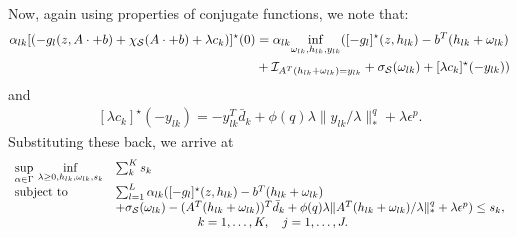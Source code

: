 Now, again using properties of conjugate functions, we note that:
\begin{equation*}
	\begin{aligned}
		\alpha_{lk}[(-g_l(z, A\cdot + b) +\chi_{\mathcal{S}}(A\cdot + b) + \lambda c_k)]^\star (0) &= \alpha_{lk}\underset{\omega_{lk}, h_{lk}, y_{lk}}{\inf} ([-g_l]^\star(z,h_{lk}) - b^T(h_{lk} + \omega_{lk})\\
  &+ \mathcal{I}_{A^T(h_{lk} + \omega_{lk})= y_{lk}} + \sigma_{\mathcal{S}}(\omega_{lk})+[\lambda c_k]^\star (-y_{lk}))
	\end{aligned}
\end{equation*}
and
\begin{equation*}
\begin{aligned}
	[\lambda c_k]^\star (-y_{lk}) =-y_{lk}^T\bar{d}_k + \phi(q)\lambda {\|}y_{lk}/\lambda{\|}^q_* + \lambda \epsilon^p.
 \end{aligned}
\end{equation*}
Substituting these back, we arrive at
\begin{equation*}
	\begin{aligned}
\begin{array}[t]{ll}
	\underset{\alpha \in \Gamma}{\sup}~\underset{\lambda \geq 0, h_{lk},\omega_{lk}, s_k}{\inf} & \sum_k^K s_k\\
	\mbox{subject to} & \sum_{l=1}^L \alpha_{lk}([-g_l]^\star(z,h_{lk}) -b^T(h_{lk} + \omega_{lk})\\
	& + \sigma_{\mathcal{S}}(\omega_{lk}) - (A^T(h_{lk} + \omega_{lk}))^T \bar{d}_k + \phi(q)\lambda {\|}A^T(h_{lk} + \omega_{lk})/\lambda{\|}^q_* + \lambda \epsilon^p ) \le s_k, \\
	&\hspace{2cm} \quad k = 1,\dots,K, \quad j = 1,\dots,J.
\end{array}
\end{aligned}
\end{equation*}
